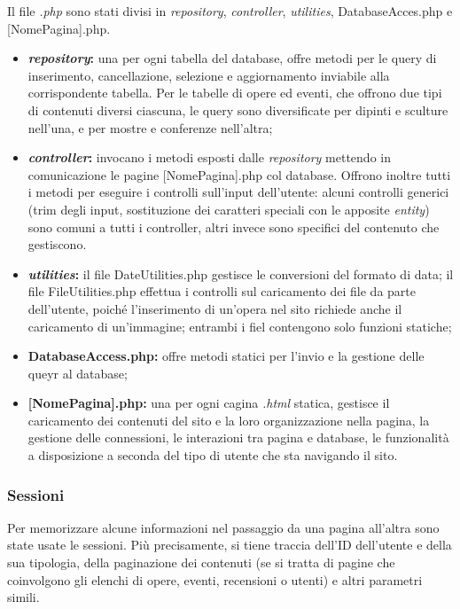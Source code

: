 Il file \textit{.php} sono stati divisi in \textit{repository}, \textit{controller}, \textit{utilities}, DatabaseAcces.php e [NomePagina].php. 
\begin{itemize}
	\item \textbf{\textit{repository}:} una per ogni tabella del database, offre metodi per le query di inserimento, cancellazione, selezione e aggiornamento inviabile alla corrispondente tabella. Per le tabelle di opere ed eventi, che offrono due tipi di contenuti diversi ciascuna, le query sono diversificate per dipinti e sculture nell'una, e per mostre e conferenze nell'altra;
	\item \textbf{\textit{controller}:} invocano i metodi esposti dalle \textit{repository} mettendo in comunicazione le pagine [NomePagina].php col database. Offrono inoltre tutti i metodi per eseguire i controlli sull'input dell'utente: alcuni controlli generici (trim degli input, sostituzione dei caratteri speciali con le apposite \textit{entity}) sono comuni a tutti i controller, altri invece sono specifici del contenuto che gestiscono.
	\item \textbf{\textit{utilities}:} il file DateUtilities.php gestisce le conversioni del formato di data; il file FileUtilities.php effettua i controlli sul caricamento dei file da parte dell'utente, poiché l'inserimento di un'opera nel sito richiede anche il caricamento di un'immagine; entrambi i fiel contengono solo funzioni statiche;
	\item \textbf{DatabaseAccess.php:} offre metodi statici per l'invio e la gestione delle queyr al database;
	\item \textbf{[NomePagina].php:} una per ogni cagina \textit{.html} statica, gestisce il caricamento dei contenuti del sito e la loro organizzazione nella pagina, la gestione delle connessioni, le interazioni tra pagina e database, le funzionalità a disposizione a seconda del tipo di utente che sta navigando il sito. 
\end{itemize}

\subsubsection{Sessioni}
\label{implementazione-php-sessioni}
Per memorizzare alcune informazioni nel passaggio da una pagina all'altra sono state usate le sessioni. Più precisamente, si tiene traccia dell'ID dell'utente e della sua tipologia, della paginazione dei contenuti (se si tratta di pagine che coinvolgono gli elenchi di opere, eventi, recensioni o utenti) e altri parametri simili.

